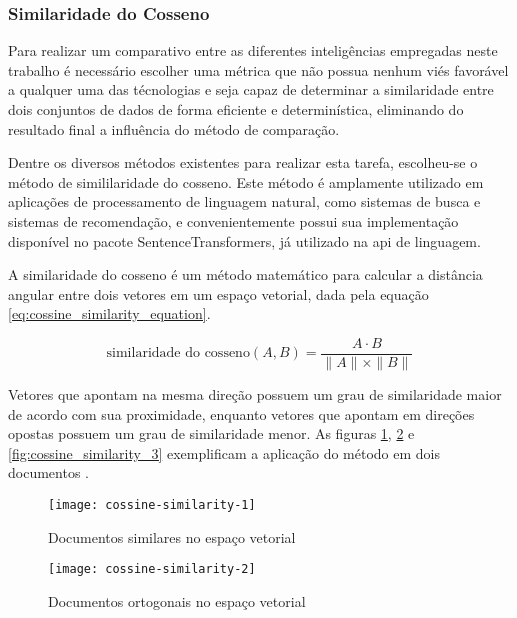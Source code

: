 \subsubsection{Similaridade do Cosseno}\label{subsubsec:cossine_similarity}

Para realizar um comparativo entre as diferentes inteligências empregadas neste trabalho é necessário escolher uma métrica que não possua nenhum viés favorável a qualquer uma das técnologias e seja capaz de determinar a similaridade entre dois conjuntos de dados de forma eficiente e determinística, eliminando do resultado final a influência do método de comparação.

Dentre os diversos métodos existentes para realizar esta tarefa, escolheu-se o método de simililaridade do cosseno. Este método é amplamente utilizado em aplicações de processamento de linguagem natural, como sistemas de busca e sistemas de recomendação, e convenientemente possui sua implementação disponível no pacote SentenceTransformers, já utilizado na \gls{api} de linguagem.

A similaridade do cosseno é um método matemático para calcular a distância angular entre dois vetores em um espaço vetorial, dada pela equação \ref{eq:cossine_similarity_equation}. 

\begin{equation}
    \label{eq:cossine_similarity_equation}
    \text{similaridade do cosseno}(A, B) = \frac{A \cdot B}{\|A\| \times \|B\|}
\end{equation}

Vetores que apontam na mesma direção possuem um grau de similaridade maior de acordo com sua proximidade, enquanto vetores que apontam em direções opostas possuem um grau de similaridade menor. As figuras \ref{fig:cossine_similarity_1}, \ref{fig:cossine_similarity_2} e \ref{fig:cossine_similarity_3} exemplificam a aplicação do método em dois documentos \cite{YlberArtan2022}.

\begin{figure}[htb]
    \caption{Documentos similares no espaço vetorial}
    \texttt{[image: cossine-similarity-1]}
    \label{fig:cossine_similarity_1}
\end{figure}

\begin{figure}[htb]
    \caption{Documentos ortogonais no espaço vetorial}
    \texttt{[image: cossine-similarity-2]}
    \label{fig:cossine_similarity_2}
\end{figure}

